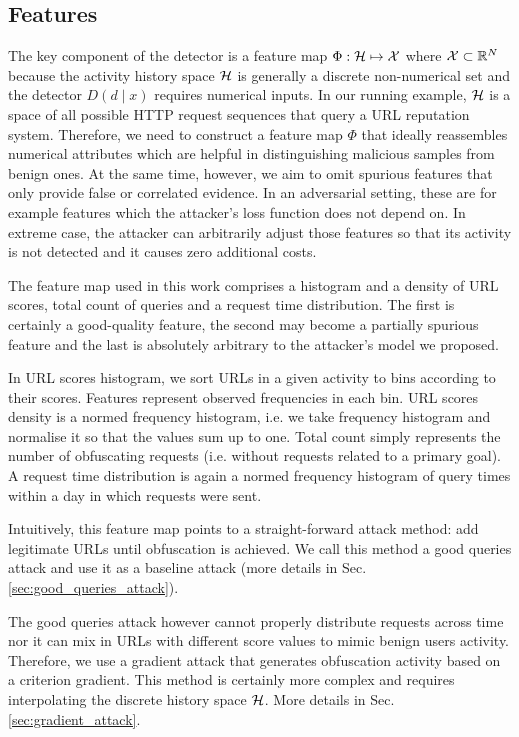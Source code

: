 \subsection{Features}\label{sec:features}
The key component of the detector is a feature map $\Phi: \mathcal{H} \mapsto \mathcal{X}$ where $\mathcal{X} \subset \mathbb{R}^N$ because the activity history space $\mathcal{H}$ is generally a discrete non-numerical set and the detector $D(d \mid x)$ requires numerical inputs. In our running example, $\mathcal{H}$ is a space of all possible HTTP request sequences that query a URL reputation system. Therefore, we need to construct a feature map $\Phi$ that ideally reassembles numerical attributes which are helpful in distinguishing malicious samples from benign ones. At the same time, however, we aim to omit spurious features that only provide false or correlated evidence. In an adversarial setting, these are for example features which the attacker's loss function does not depend on. In extreme case, the attacker can arbitrarily adjust those features so that its activity is not detected and it causes zero additional costs.

The feature map used in this work comprises a histogram and a density of URL scores, total count of queries and a request time distribution. The first is certainly a good-quality feature, the second may become a partially spurious feature and the last is absolutely arbitrary to the attacker's model we proposed.

In URL scores histogram, we sort URLs in a given activity to bins according to their scores. Features represent observed frequencies in each bin. URL scores density is a normed frequency histogram, i.e. we take frequency histogram and normalise it so that the values sum up to one. Total count simply represents the number of obfuscating requests (i.e. without requests related to a primary goal). A request time distribution is again a normed frequency histogram of query times within a day in which requests were sent.

Intuitively, this feature map points to a straight-forward attack method: add legitimate URLs until obfuscation is achieved. We call this method a good queries attack and use it as a baseline attack (more details in Sec. \ref{sec:good_queries_attack}).

The good queries attack however cannot properly distribute requests across time nor it can mix in URLs with different score values to mimic benign users activity. Therefore, we use a gradient attack that generates obfuscation activity based on a criterion gradient. This method is certainly more complex and requires interpolating the discrete history space $\mathcal{H}$. More details in Sec. \ref{sec:gradient_attack}.

